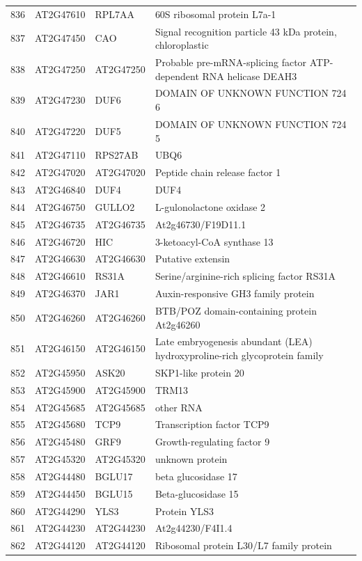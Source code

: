 \documentclass[11pt]{article}
\begin{document}
\begin{center}
\begin{tabular}{rlll}
836 & AT2G47610 & RPL7AA & 60S ribosomal protein L7a-1\\
837 & AT2G47450 & CAO & Signal recognition particle 43 kDa protein, chloroplastic\\
838 & AT2G47250 & AT2G47250 & Probable pre-mRNA-splicing factor ATP-dependent RNA helicase DEAH3\\
839 & AT2G47230 & DUF6 & DOMAIN OF UNKNOWN FUNCTION 724 6\\
840 & AT2G47220 & DUF5 & DOMAIN OF UNKNOWN FUNCTION 724 5\\
841 & AT2G47110 & RPS27AB & UBQ6\\
842 & AT2G47020 & AT2G47020 & Peptide chain release factor 1\\
843 & AT2G46840 & DUF4 & DUF4\\
844 & AT2G46750 & GULLO2 & L-gulonolactone oxidase 2\\
845 & AT2G46735 & AT2G46735 & At2g46730/F19D11.1\\
846 & AT2G46720 & HIC & 3-ketoacyl-CoA synthase 13\\
847 & AT2G46630 & AT2G46630 & Putative extensin\\
848 & AT2G46610 & RS31A & Serine/arginine-rich splicing factor RS31A\\
849 & AT2G46370 & JAR1 & Auxin-responsive GH3 family protein\\
850 & AT2G46260 & AT2G46260 & BTB/POZ domain-containing protein At2g46260\\
851 & AT2G46150 & AT2G46150 & Late embryogenesis abundant (LEA) hydroxyproline-rich glycoprotein family\\
852 & AT2G45950 & ASK20 & SKP1-like protein 20\\
853 & AT2G45900 & AT2G45900 & TRM13\\
854 & AT2G45685 & AT2G45685 & other RNA\\
855 & AT2G45680 & TCP9 & Transcription factor TCP9\\
856 & AT2G45480 & GRF9 & Growth-regulating factor 9\\
857 & AT2G45320 & AT2G45320 & unknown protein\\
858 & AT2G44480 & BGLU17 & beta glucosidase 17\\
859 & AT2G44450 & BGLU15 & Beta-glucosidase 15\\
860 & AT2G44290 & YLS3 & Protein YLS3\\
861 & AT2G44230 & AT2G44230 & At2g44230/F4I1.4\\
862 & AT2G44120 & AT2G44120 & Ribosomal protein L30/L7 family protein\\

\end{tabular}
\end{center}
\end{document}
